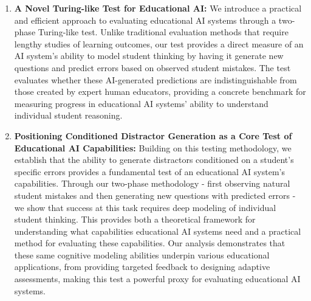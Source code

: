 \begin{enumerate}
    \item \textbf{A Novel Turing-like Test for Educational AI:}
    We introduce a practical and efficient approach to evaluating educational AI systems through a two-phase Turing-like test. Unlike traditional evaluation methods that require lengthy studies of learning outcomes, our test provides a direct measure of an AI system's ability to model student thinking by having it generate new questions and predict errors based on observed student mistakes. The test evaluates whether these AI-generated predictions are indistinguishable from those created by expert human educators, providing a concrete benchmark for measuring progress in educational AI systems' ability to understand individual student reasoning.

    \item \textbf{Positioning Conditioned Distractor Generation as a Core Test of Educational AI Capabilities:}
    Building on this testing methodology, we establish that the ability to generate distractors conditioned on a student's specific errors provides a fundamental test of an educational AI system's capabilities. Through our two-phase methodology - first observing natural student mistakes and then generating new questions with predicted errors - we show that success at this task requires deep modeling of individual student thinking. This provides both a theoretical framework for understanding what capabilities educational AI systems need and a practical method for evaluating these capabilities. Our analysis demonstrates that these same cognitive modeling abilities underpin various educational applications, from providing targeted feedback to designing adaptive assessments, making this test a powerful proxy for evaluating educational AI systems.
\end{enumerate}
